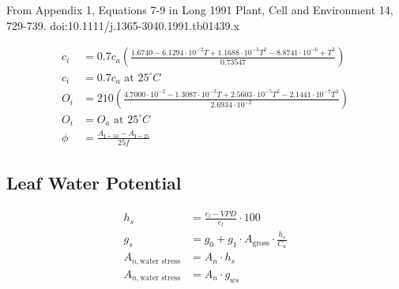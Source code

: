 \documentclass[12pt]{report}
\begin{document}
From Appendix 1, Equations 7-9 in Long 1991 Plant, Cell and Environment 14, 729-739. doi:10.1111/j.1365-3040.1991.tb01439.x

\begin{align}
c_i &= 0.7c_a\left(\frac{1.6740-6.1294\cdot10^{-2}T+1.1688\cdot10^{-3}T^2-8.8741\cdot10^{-6}+T^3}{0.73547}\right)\\
c_i&=0.7c_a \text{ at } 25^{\circ}C \\
O_i&=210\left(\frac{4.7000\cdot10^{-2}-1.3087\cdot10^{-3}T+2.5603\cdot10^{-5}T^2-2.1441\cdot10^{-7}T^3}{2.6934\cdot10^{-2}}\right)\\
O_i&=O_a  \text{ at } 25^{\circ}C\\
\phi&=\frac{A_{\text{I}=50}-A_{\text{I}=25}}{25f}
\end{align}

\subsection*{Leaf Water Potential}
\begin{align}
 h_{s} &= \frac{e_{l} - VPD}{e_{l}} \cdot 100 \label{eqn:hs} \\
 g_{s} &= g_{0} + g_{1} \cdot A_{\text{gross}} \cdot \frac{h_{s}}{C_{a}} \label{eqn:gs} \\
A_{n,\text{water stress}} &= A_n\cdot h_s\\
A_{n,\text{water stress}} &= A_n\cdot g_{ws}\\
\end{align}
\end{document}
